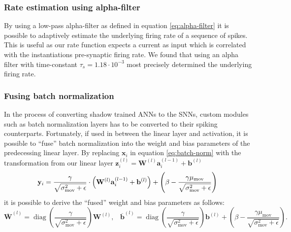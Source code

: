 \documentclass[a4paper,11pt]{article}
\begin{document}
\subsubsection{Rate estimation using alpha-filter}
By using a low-pass alpha-filter as defined in equation \ref{eq:alpha-filter} it is possible to adaptively estimate the underlying firing rate of a sequence of spikes. This is useful as our rate function expects a current as input which is correlated with the instantiations pre-synaptic firing rate. We found that using an alpha filter with time-constant $\tau_s = 1.18 \cdot 10^{-3}$ most precisely determined the underlying firing rate. 

\subsubsection{Fusing batch normalization}
In the process of converting shadow trained ANNs to the SNNs, custom modules such as batch normalization layers has to be converted to their spiking counterparts. Fortunately, if used in between the linear layer and activation, it is possible to ``fuse'' batch normalization into the weight and bias parameters of the predecessing linear layer. By replacing $\mathbf{x}_i$ in equation \ref{eq:batch-norm} with the transformation from our linear layer $\mathbf{z}_i^{(l)} = \mathbf{W}^{(l)} \mathbf{a}^{(l-1)}_i  + \mathbf{b}^{(l)}$ 
\begin{equation}
    \mathbf{y}_i = \frac{\gamma}{\sqrt{\sigma^{2}_\text{mov} +\epsilon}} \cdot \left( 
      \mathbf{W}^{(l)} \mathbf{a}^{(l-1)}_i  + \mathbf{b}^{(l)}
    \right) + \left(\beta - \frac{\gamma \mu_\text{mov}}{\sqrt{\sigma^{2}_\text{mov}+\epsilon}}\right) \\
\end{equation}
it is possible to derive the ``fused'' weight and bias parameters as follows:
\begin{equation}
    \overline{\mathbf{W}}^{(l)} = \operatorname{diag} \left( \frac{\gamma}{\sqrt{\sigma^{2}_\text{mov} +\epsilon}} \right) \mathbf{W}^{(l)}, \hspace{10pt} \overline{\mathbf{b}}^{(l)} =  \operatorname{diag} \left( \frac{\gamma}{\sqrt{\sigma^{2}_\text{mov} +\epsilon}} \right) \mathbf{b}^{(l)} + \left(\beta - \frac{\gamma \mu_\text{mov}}{\sqrt{\sigma^{2}_\text{mov}+\epsilon}}\right).
\end{equation}
\end{document}
